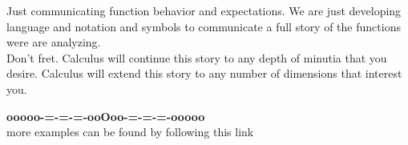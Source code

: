 \documentclass{ximera}
\begin{document}
Just communicating function behavior and expectations.  We are just developing language and notation and symbols to communicate a full story of the functions were are analyzing. \\


Don't fret. Calculus will continue this story to any depth of minutia that you desire. Calculus will extend this story to any number of dimensions that interest you.











\begin{center}
\textbf{\textcolor{green!50!black}{ooooo-=-=-=-ooOoo-=-=-=-ooooo}} \\

more examples can be found by following this link\\ 

\end{center}
\end{document}
